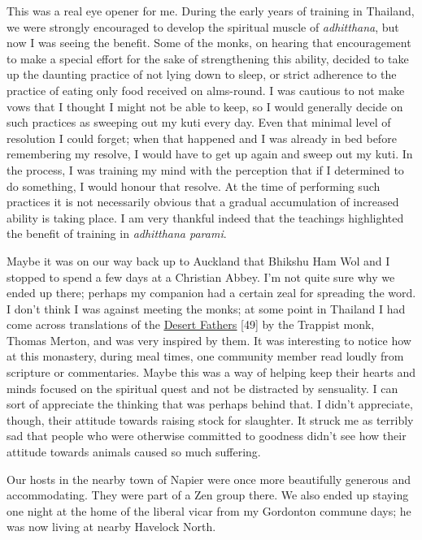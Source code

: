 This was a real eye opener for me. During the early years of training in
Thailand, we were strongly encouraged to develop the spiritual muscle of
\emph{adhitthana}, but now I was seeing the benefit. Some of the monks,
on hearing that encouragement to make a special effort for the sake of
strengthening this ability, decided to take up the daunting practice of
not lying down to sleep, or strict adherence to the practice of eating
only food received on alms-round. I was cautious to not make vows that I
thought I might not be able to keep, so I would generally decide on such
practices as sweeping out my kuti every day. Even that minimal level of
resolution I could forget; when that happened and I was already in bed
before remembering my resolve, I would have to get up again and sweep
out my kuti. In the process, I was training my mind with the perception
that if I determined to do something, I would honour that resolve. At
the time of performing such practices it is not necessarily obvious that
a gradual accumulation of increased ability is taking place. I am very
thankful indeed that the teachings highlighted the benefit of training
in \emph{adhitthana parami}.

Maybe it was on our way back up to Auckland that Bhikshu Ham Wol and I
stopped to spend a few days at a Christian Abbey. I'm not quite sure why
we ended up there; perhaps my companion had a certain zeal for spreading
the word. I don't think I was against meeting the monks; at some point
in Thailand I had come across translations of the
\href{https://www.amazon.co.uk/Wisdom-Desert-New-Directions-Paparback/dp/0811201023}{\underline{Desert
Fathers}} {[}49{]} by the Trappist monk, Thomas Merton, and was very
inspired by them. It was interesting to notice how at this monastery,
during meal times, one community member read loudly from scripture or
commentaries. Maybe this was a way of helping keep their hearts and
minds focused on the spiritual quest and not be distracted by
sensuality. I can sort of appreciate the thinking that was perhaps
behind that. I didn't appreciate, though, their attitude towards raising
stock for slaughter. It struck me as terribly sad that people who were
otherwise committed to goodness didn't see how their attitude towards
animals caused so much suffering.

Our hosts in the nearby town of Napier were once more beautifully
generous and accommodating. They were part of a Zen group there. We also
ended up staying one night at the home of the liberal vicar from my
Gordonton commune days; he was now living at nearby Havelock North.

